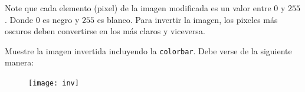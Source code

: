 \documentclass[11pt,letterpaper]{exam}
\begin{document}
\begin{questions}

Note que cada elemento (pixel) de la imagen modificada es un valor entre $0$ y $255$. Donde $0$ es negro y $255$ es blanco. Para invertir la imagen, los pixeles m\'as oscuros deben convertirse en los m\'as claros y viceversa.

Muestre la imagen invertida incluyendo la \verb'colorbar'. Debe verse de la siguiente manera:

\begin{figure}[H]
  \centering
  \texttt{[image: inv]}
\end{figure}

\end{questions}
\end{document}
